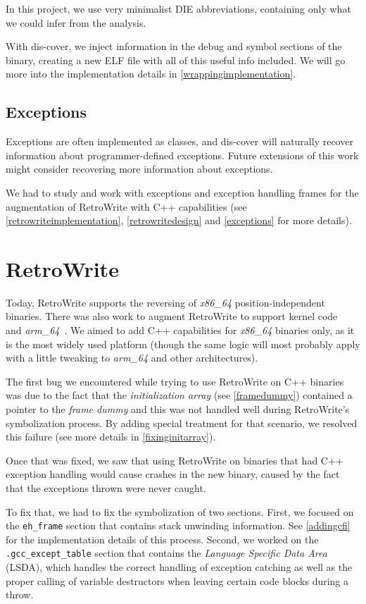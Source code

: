 \documentclass[a4paper,11pt,oneside]{report}
\begin{document}
In this project, we use very minimalist DIE abbreviations, containing only
what we could infer from the analysis.

With dis-cover, we inject information in the debug and symbol sections of the
binary, creating a new ELF file with all of this useful info included.
We will go more into the implementation details in 
\autoref{wrappingimplementation}.

\subsection{Exceptions}

Exceptions are often implemented as classes, and dis-cover will naturally 
recover information about programmer-defined exceptions.
Future extensions of this work might consider recovering more information about 
exceptions.

We had to study and work with exceptions and exception handling frames for 
the augmentation of RetroWrite with C++ capabilities
(see \autoref{retrowriteimplementation}, \autoref{retrowritedesign} and
\autoref{exceptions} for more details).


\section{RetroWrite}
\label{retrowritedesign}

Today, RetroWrite supports the reversing of \emph{x86\_64}
position-independent binaries.
There was also work to augment RetroWrite to support kernel 
code~\cite{rwkernel} and \emph{arm\_64}~\cite{rwarm}.
We aimed to add C++ capabilities for \emph{x86\_64} binaries only, as it is
the most widely used platform (though the same logic will most probably apply
with a little tweaking to \emph{arm\_64} and other architectures).

The first bug we encountered while trying to use RetroWrite on C++ binaries
was due to the fact that the \emph{initialization array} (see
\autoref{framedummy}) contained a pointer to the \emph{frame dummy} and this
was not handled well during RetroWrite's symbolization process.
By adding special treatment for that scenario, we resolved this failure (see
more details in \autoref{fixinginitarray}).

Once that was fixed, we saw that using RetroWrite on binaries that had C++
exception handling would cause crashes in the new binary, caused by the fact
that the exceptions thrown were never caught.

To fix that, we had to fix the symbolization of two sections.
First, we focused on the \texttt{eh\_frame} section that contains stack
unwinding information.
See \autoref{addingcfi} for the implementation details of this process.
Second, we worked on the \texttt{.gcc\_except\_table} section that contains
the \emph{Language Specific Data Area} (LSDA), which handles the correct
handling of exception catching as well as the proper calling of variable
destructors when leaving certain code blocks during a throw.
\end{document}

